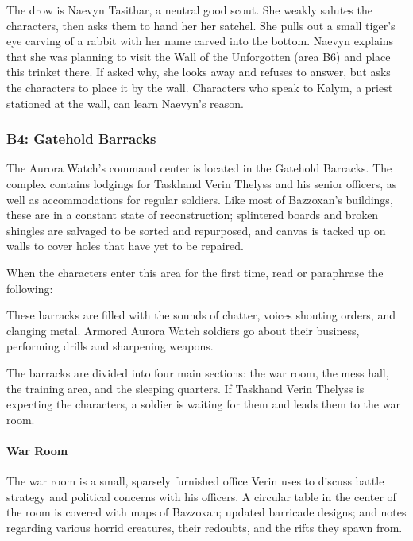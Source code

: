 \documentclass[10pt,a4paper,twoside,bg=print,twocolumn,openany,nodeprecatedcode]{dndbook}
\begin{document}
The drow is Naevyn Tasithar, a neutral good scout. She weakly salutes the characters, then asks them to hand her her satchel. She pulls out a small tiger's eye carving of a rabbit with her name carved into the bottom. Naevyn explains that she was planning to visit the Wall of the Unforgotten (area B6) and place this trinket there. If asked why, she looks away and refuses to answer, but asks the characters to place it by the wall. Characters who speak to Kalym, a priest stationed at the wall, can learn Naevyn's reason.

\subsubsection{B4: Gatehold Barracks}
The Aurora Watch's command center is located in the Gatehold Barracks. The complex contains lodgings for Taskhand Verin Thelyss and his senior officers, as well as accommodations for regular soldiers. Like most of Bazzoxan's buildings, these are in a constant state of reconstruction; splintered boards and broken shingles are salvaged to be sorted and repurposed, and canvas is tacked up on walls to cover holes that have yet to be repaired.

When the characters enter this area for the first time, read or paraphrase the following:

\begin{DndReadAloud}{}
These barracks are filled with the sounds of chatter, voices shouting orders, and clanging metal. Armored Aurora Watch soldiers go about their business, performing drills and sharpening weapons.

\end{DndReadAloud}

The barracks are divided into four main sections: the war room, the mess hall, the training area, and the sleeping quarters. If Taskhand Verin Thelyss is expecting the characters, a soldier is waiting for them and leads them to the war room.

\paragraph{War Room}
The war room is a small, sparsely furnished office Verin uses to discuss battle strategy and political concerns with his officers. A circular table in the center of the room is covered with maps of Bazzoxan; updated barricade designs; and notes regarding various horrid creatures, their redoubts, and the rifts they spawn from.
\end{document}
